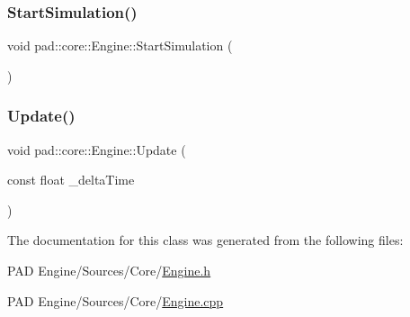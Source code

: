 \mbox{\label{classpad_1_1core_1_1_engine_a02dfcdfa4826c9ae9ee18d16d22c0e33}} 
\subsubsection{\texorpdfstring{Start\+Simulation()}{StartSimulation()}}
{\footnotesize\ttfamily void pad\+::core\+::\+Engine\+::\+Start\+Simulation (\begin{DoxyParamCaption}{ }\end{DoxyParamCaption})}

\mbox{\label{classpad_1_1core_1_1_engine_a6d450c23f74f2a7264406fe607e0a6fa}} 
\subsubsection{\texorpdfstring{Update()}{Update()}}
{\footnotesize\ttfamily void pad\+::core\+::\+Engine\+::\+Update (\begin{DoxyParamCaption}\item[{const float}]{\+\_\+delta\+Time }\end{DoxyParamCaption})}



The documentation for this class was generated from the following files\+:\begin{DoxyCompactItemize}
\item 
P\+A\+D Engine/\+Sources/\+Core/\mbox{\hyperlink{_engine_8h}{Engine.\+h}}\item 
P\+A\+D Engine/\+Sources/\+Core/\mbox{\hyperlink{_engine_8cpp}{Engine.\+cpp}}\end{DoxyCompactItemize}
